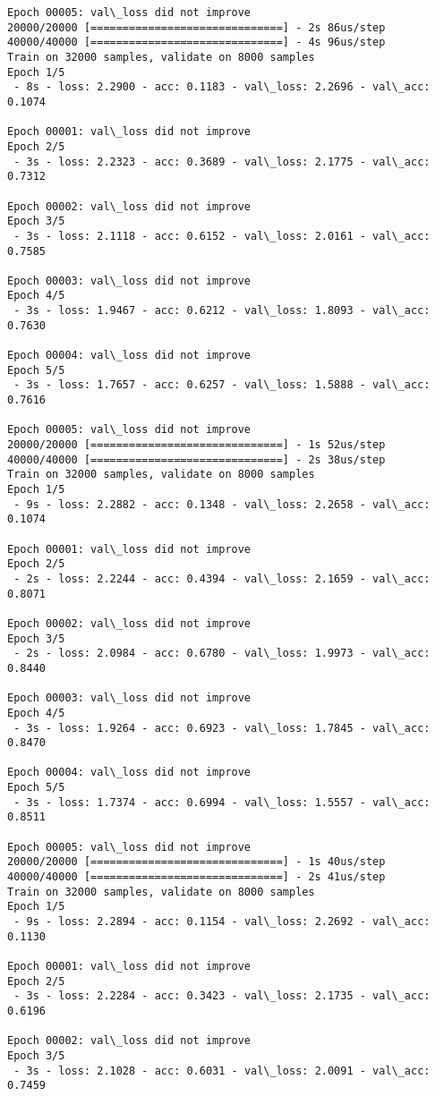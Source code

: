 \documentclass[11pt]{article}
\begin{document}
\begin{Verbatim}[commandchars=\\\{\}]
Epoch 00005: val\_loss did not improve
20000/20000 [==============================] - 2s 86us/step
40000/40000 [==============================] - 4s 96us/step
Train on 32000 samples, validate on 8000 samples
Epoch 1/5
 - 8s - loss: 2.2900 - acc: 0.1183 - val\_loss: 2.2696 - val\_acc: 0.1074

Epoch 00001: val\_loss did not improve
Epoch 2/5
 - 3s - loss: 2.2323 - acc: 0.3689 - val\_loss: 2.1775 - val\_acc: 0.7312

Epoch 00002: val\_loss did not improve
Epoch 3/5
 - 3s - loss: 2.1118 - acc: 0.6152 - val\_loss: 2.0161 - val\_acc: 0.7585

Epoch 00003: val\_loss did not improve
Epoch 4/5
 - 3s - loss: 1.9467 - acc: 0.6212 - val\_loss: 1.8093 - val\_acc: 0.7630

Epoch 00004: val\_loss did not improve
Epoch 5/5
 - 3s - loss: 1.7657 - acc: 0.6257 - val\_loss: 1.5888 - val\_acc: 0.7616

Epoch 00005: val\_loss did not improve
20000/20000 [==============================] - 1s 52us/step
40000/40000 [==============================] - 2s 38us/step
Train on 32000 samples, validate on 8000 samples
Epoch 1/5
 - 9s - loss: 2.2882 - acc: 0.1348 - val\_loss: 2.2658 - val\_acc: 0.1074

Epoch 00001: val\_loss did not improve
Epoch 2/5
 - 2s - loss: 2.2244 - acc: 0.4394 - val\_loss: 2.1659 - val\_acc: 0.8071

Epoch 00002: val\_loss did not improve
Epoch 3/5
 - 2s - loss: 2.0984 - acc: 0.6780 - val\_loss: 1.9973 - val\_acc: 0.8440

Epoch 00003: val\_loss did not improve
Epoch 4/5
 - 3s - loss: 1.9264 - acc: 0.6923 - val\_loss: 1.7845 - val\_acc: 0.8470

Epoch 00004: val\_loss did not improve
Epoch 5/5
 - 3s - loss: 1.7374 - acc: 0.6994 - val\_loss: 1.5557 - val\_acc: 0.8511

Epoch 00005: val\_loss did not improve
20000/20000 [==============================] - 1s 40us/step
40000/40000 [==============================] - 2s 41us/step
Train on 32000 samples, validate on 8000 samples
Epoch 1/5
 - 9s - loss: 2.2894 - acc: 0.1154 - val\_loss: 2.2692 - val\_acc: 0.1130

Epoch 00001: val\_loss did not improve
Epoch 2/5
 - 3s - loss: 2.2284 - acc: 0.3423 - val\_loss: 2.1735 - val\_acc: 0.6196

Epoch 00002: val\_loss did not improve
Epoch 3/5
 - 3s - loss: 2.1028 - acc: 0.6031 - val\_loss: 2.0091 - val\_acc: 0.7459


\end{Verbatim}
\end{document}
